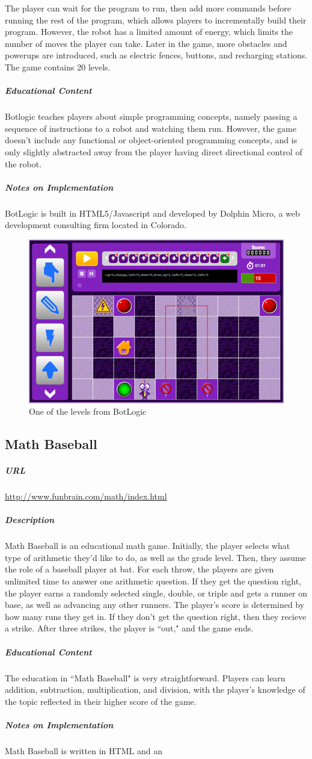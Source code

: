 The player can wait for the program to run, then add more commands before running the rest of the program, which allows players to incrementally build their program. However, the robot has a limited amount of energy, which limits the number of moves the player can take. Later in the game, more obstacles and powerups are introduced, such as electric fences, buttons, and recharging stations. The game contains 20 levels.\subparagraph{Educational Content}Botlogic teaches players about simple programming concepts, namely passing a sequence of instructions to a robot and watching them run. However, the game doesn't include any functional or object-oriented programming concepts, and is only slightly abstracted away from the player having direct directional control of the robot.\subparagraph{Notes on Implementation}BotLogic is built in HTML5/Javascript and developed by Dolphin Micro, a web development consulting firm located in Colorado.\begin{figure}[p]\centering \includegraphics[height=.4\textheight, width=\textwidth, keepaspectratio=true]{img/botlogic_screen.png}\caption{One of the levels from BotLogic}\end{figure}\subsection{Math Baseball}\subparagraph{URL}\url{http://www.funbrain.com/math/index.html}\subparagraph{Description}Math Baseball is an educational math game. Initially, the player selects what type of arithmetic they'd like to do, as well as the grade level. Then, they assume the role of a baseball player at bat. For each throw, the players are given unlimited time to answer one arithmetic question. If they get the question right, the player earns a randomly selected single, double, or triple and gets a runner on base, as well as advancing any other runners. The player's score is determined by how many runs they get in. If they don't get the question right, then they recieve a strike. After three strikes, the player is ``out," and the game ends.\subparagraph{Educational Content}The education in ``Math Baseball" is very straightforward. Players can learn addition, subtraction, multiplication, and division, with the player's knowledge of the topic reflected in their higher score of the game.\subparagraph{Notes on Implementation}Math Baseball is written in HTML and an 